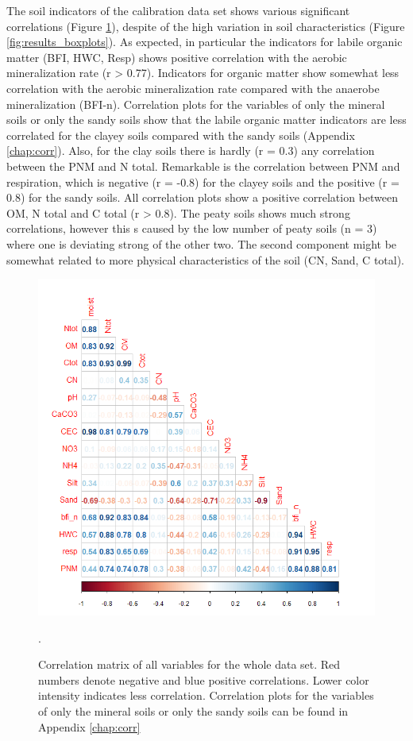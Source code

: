 \documentclass[10pt,twoside,dutch,english]{report}
\begin{document}
The soil indicators of the calibration data set shows various significant correlations (Figure \ref{fig:results_corr}), despite of the high variation in soil characteristics (Figure \ref{fig:results_boxplots}). As expected, in particular the indicators for labile organic matter (BFI, HWC, Resp) shows positive correlation with the aerobic mineralization rate (r > 0.77). Indicators for organic matter show somewhat less correlation with the aerobic mineralization rate compared with the anaerobe mineralization (BFI-n). Correlation plots for the variables of  only the mineral soils or only the sandy soils  show that the labile organic matter indicators are less correlated for the clayey soils compared with the sandy soils  (Appendix \ref{chap:corr}). Also, for the clay soils there is hardly (r = 0.3) any correlation between the PNM and N total. Remarkable is the  correlation between PNM and respiration, which is negative (r = -0.8)  for the clayey soils and the positive (r = 0.8) for the sandy soils. All correlation plots show a positive correlation between OM, N total and C total (r > 0.8). The peaty soils shows much strong correlations, however this s caused by the low number of peaty soils (n = 3) where one is deviating strong of the other two. The second component might be somewhat related to more physical characteristics of the soil (CN, Sand, C total). 
	\begin{figure}[h] %
	\centering
	\includegraphics[width=0.7\linewidth]{results_corr}
	\caption{Correlation matrix of all variables for the whole data set.  Red numbers denote negative and blue positive correlations. Lower color intensity indicates less correlation. Correlation plots for the variables of  only the mineral soils or only the sandy soils can be found in Appendix \ref{chap:corr}}.
	\label{fig:results_corr}
\end{figure}
\end{document}
